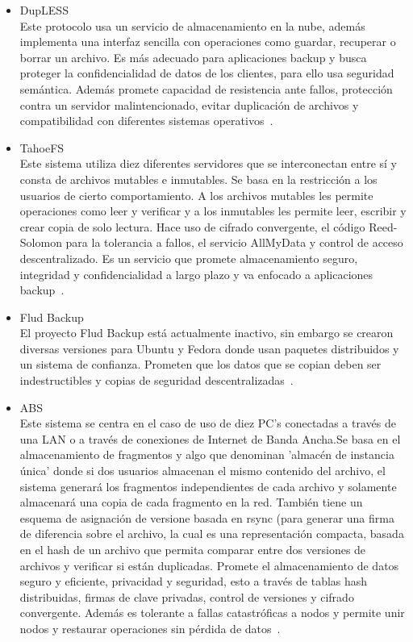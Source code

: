 \begin{itemize}
\item DupLESS\\
Este protocolo usa un servicio de almacenamiento en la nube, además implementa una interfaz sencilla con operaciones como guardar, recuperar o borrar un archivo. Es más adecuado para aplicaciones backup y busca proteger la confidencialidad de datos de los clientes, para ello usa seguridad semántica. Además promete capacidad de resistencia ante fallos, protección contra un servidor malintencionado, evitar duplicación de archivos y compatibilidad con diferentes sistemas operativos~\cite{Bellare}.
\item TahoeFS\\
Este sistema utiliza diez diferentes servidores que se interconectan entre sí y consta de archivos mutables e inmutables. Se basa en la restricción a los usuarios de cierto comportamiento. A los archivos mutables les permite operaciones como leer y verificar y a los inmutables les permite leer, escribir y crear copia de solo lectura. Hace uso de cifrado convergente, el código Reed-Solomon para la tolerancia a fallos, el servicio AllMyData y control de acceso descentralizado.
Es un servicio que promete almacenamiento seguro, integridad y confidencialidad a largo plazo y va enfocado a aplicaciones backup~\cite{tahoe}.
\item Flud Backup\\
El proyecto Flud Backup está actualmente inactivo, sin embargo se crearon diversas versiones para Ubuntu y Fedora donde usan paquetes distribuidos y un sistema de confianza. Prometen que los datos que se copian deben ser indestructibles y copias de seguridad descentralizadas~\cite{flud}.
\item ABS\\
Este sistema se centra en el caso de uso de diez PC's conectadas a través de una LAN o a través de conexiones de Internet de Banda Ancha.Se basa en el almacenamiento de fragmentos y algo que denominan 'almacén de instancia única' donde si dos usuarios almacenan el mismo contenido del archivo, el sistema generará los fragmentos independientes de cada archivo y solamente almacenará una copia de cada fragmento en la red. También tiene un esquema de asignación de versione basada en rsync (para generar una firma de diferencia sobre el archivo, la cual es una representación compacta, basada en el hash de un archivo que permita comparar entre dos versiones de archivos y verificar si están duplicadas. 
Promete el almacenamiento de datos seguro y eficiente, privacidad y seguridad, esto a través de tablas hash distribuidas, firmas de clave privadas, control de versiones y cifrado convergente. 
Además es tolerante a fallas catastróficas a nodos y permite unir nodos y restaurar operaciones sin pérdida de datos~\cite{abs}.
\end{itemize}


